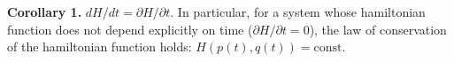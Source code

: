 \textbf{Corollary 1.} $dH/dt = \partial H/\partial t$. In particular, for a system whose hamiltonian function does not depend explicitly on time ($\partial H/\partial t = 0$), the law of conservation of the hamiltonian function holds: $H(p(t), q(t)) = \text{const}$.
